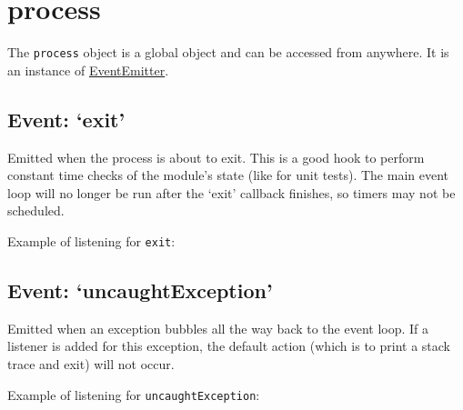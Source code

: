 \section{process}

The \texttt{process} object is a global object and can be accessed from
anywhere. It is an instance of
\href{events.html\#events\_class\_events\_eventemitter}{EventEmitter}.

\subsection{Event: `exit'}

Emitted when the process is about to exit. This is a good hook to
perform constant time checks of the module's state (like for unit
tests). The main event loop will no longer be run after the `exit'
callback finishes, so timers may not be scheduled.

Example of listening for \texttt{exit}:

\begin{Shaded}
\begin{Highlighting}[]
\NormalTok{(}\NormalTok{, }\NormalTok{() \{}
  \NormalTok{() \{}
    \NormalTok{(}\NormalTok{);}
  \NormalTok{\}, }\NormalTok{);}
  \NormalTok{(}\NormalTok{);}
\NormalTok{\});}
\end{Highlighting}
\end{Shaded}

\subsection{Event: `uncaughtException'}

Emitted when an exception bubbles all the way back to the event loop. If
a listener is added for this exception, the default action (which is to
print a stack trace and exit) will not occur.

Example of listening for \texttt{uncaughtException}:

